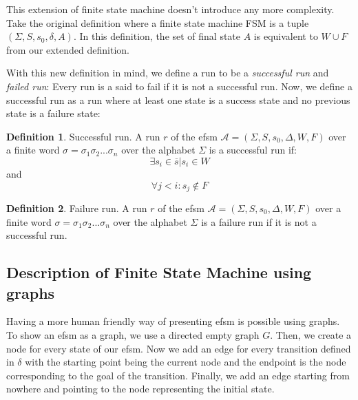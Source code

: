 \documentclass[12pt]{article}
\theoremstyle{definition}
\newtheorem{definition}{Definition}[section]
\theoremstyle{definition}
\theoremstyle{remark}
\newcommand{\A}{\mathcal{A}}
\begin{document}
This extension of finite state machine doesn't introduce any more complexity. Take the original definition where a finite state machine FSM is a tuple $(\Sigma, S, s_{0},\delta, A)$. In this definition, the set of final state $A$ is equivalent to $W \cup F$ from our extended definition.

With this new definition in mind, we define a run to be a \textit{successful run} and \textit{failed run}: Every run is a said to fail if it is not a successful run. Now, we define a successful run as a run where at least one state is a success state and no previous state is a failure state:

\theoremstyle{definition}
\begin{definition}{Successful run.} A run $r$ of the \gls{efsm} $\A = (\Sigma, S, s_{0}, \Delta, W, F)$ over a finite word $\sigma = \sigma_1 \sigma_2 ... \sigma_n$ over the alphabet $\Sigma$ is a successful run if:
$$\exists s_i \in \overline{s} | s_{i} \in W$$ and $$\forall j < i: s_{j} \notin F$$
\end{definition}

\theoremstyle{definition}
\begin{definition}{Failure run.} A run $r$ of the \gls{efsm} $\A = (\Sigma, S, s_{0}, \Delta, W, F)$ over a finite word $\sigma = \sigma_1 \sigma_2 ... \sigma_n$ over the alphabet $\Sigma$ is a failure run if it is not a successful run.
\end{definition}



\subsection{Description of Finite State Machine using graphs}

Having a more human friendly way of presenting \gls{efsm} is possible using graphs. To show an \gls{efsm} as a graph, we use a directed empty graph $G$. Then, we create a node for every state of our \gls{efsm}. Now we add an edge for every transition defined in $\delta$ with the starting point being the current node and the endpoint is the node corresponding to the goal of the transition. Finally, we add an edge starting from nowhere and pointing to the node representing the initial state.\\
\end{document}
